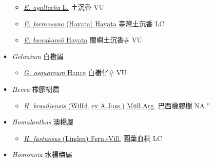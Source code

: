 \begin{itemize}
  \begin{itemize}
        \item[] \href{http://www.theplantlist.org/tpl1.1/search?q=Excoecaria+agallocha}{\textit{E. agallocha} L.}   土沉香 VU
        \item[] \href{http://www.theplantlist.org/tpl1.1/search?q=Excoecaria+formosana}{\textit{E. formosana} (Hayata) Hayata}   臺灣土沉香 LC
        \item[] \href{http://www.theplantlist.org/tpl1.1/search?q=Excoecaria+kawakamii}{\textit{E. kawakamii} Hayata}   蘭嶼土沉香\# VU
  \end{itemize}
 \item[] \textit{Gelonium} 白樹屬
                    
  \begin{itemize}
        \item[] \href{http://www.theplantlist.org/tpl1.1/search?q=Gelonium+aequoreum}{\textit{G. aequoreum} Hance}   白樹仔\# VU
  \end{itemize}
 \item[] \textit{Hevea} 橡膠樹屬
                    
  \begin{itemize}
        \item[] \href{http://www.theplantlist.org/tpl1.1/search?q=Hevea+brasiliensis}{\textit{H. brasiliensis} (Willd. ex A.Juss.) Müll.Arg.}   巴西橡膠樹 NA $^n$
  \end{itemize}
 \item[] \textit{Homalanthus} 澳楊屬
                    
  \begin{itemize}
        \item[] \href{http://www.theplantlist.org/tpl1.1/search?q=Homalanthus+fastuosus}{\textit{H. fastuosus} (Linden) Fern.-Vill.}     圓葉血桐 LC
  \end{itemize}
 \item[] \textit{Homonoia} 水楊梅屬
                    

\end{itemize}
